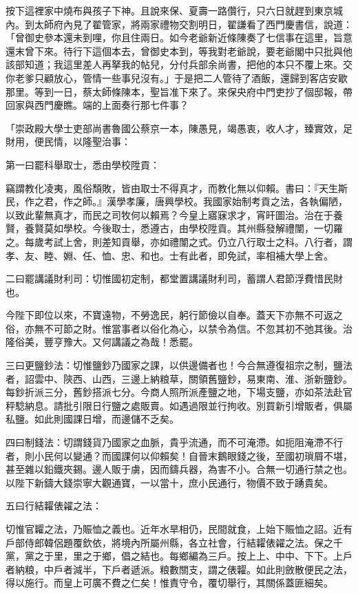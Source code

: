 按下這裡家中燒布與孩子下神。且說來保、夏壽一路儹行，只六日就趕到東京城內。到太師府內見了翟管家，將兩家禮物交割明日，翟謙看了西門慶書信，說道：「曾御史參本還未到哩，你且住兩日。如今老爺新近條陳奏了七信事在這里，旨意還末曾下來。待行下這個本去，曾御史本到，等我對老爺說，要老爺閣中只批與他該部知道；我這里差人再拏我的帖兒，分付兵部余尚書，把他的本只不覆上來。交你老爹只顧放心，管情一些事兒沒有。」于是把二人管待了酒飯，還歸到客店安歇那里。等到一日，蔡太師條陳本，聖旨准下來了。來保央府中門吏抄了個邸報，帶回家與西門慶瞧。端的上面奏行那七件事？

「崇政殿大學士吏部尚書魯國公蔡京一本，陳愚見，竭愚衷，收人才，臻實效，足財用，便民情，以隆聖治事：

第一曰罷科舉取士，悉由學校陞貢：

竊謂教化凌夷，風俗頹敗，皆由取士不得真才，而教化無以仰賴。書曰：『天生斯民，作之君，作之師。』漢學孝廉，唐興學校。我國家始制考貢之法，各執偏陋，以致此輩無真才，而民之司牧何以賴焉？今皇上寤寐求才，宵旰圖治。治在于養賢，養賢莫如學校。今後取士，悉遵古，由學校陞貢。其州縣發解禮闈，一切羅之。每歲考試上舍，則差知貢舉，亦如禮闈之式。仍立八行取士之科。八行者，謂孝、友、睦、婣、任、恤、忠、和也。士有此者，即免試，率相補大學上舍。

二曰罷講議財利司：切惟國初定制，都堂置講議財利司，蓄謂人君節浮費惜民財也。

今陛下即位以來，不寶遠物，不勞逸民，躬行節儉以自奉。蓋天下亦無不可返之俗，亦無不可節之財。惟當事者以俗化為心，以禁令為信。不忽其初不弛其後。治隆俗美，豐亨豫大。又何講議之為哉！悉罷。

三曰更鹽鈔法：切惟鹽鈔乃國家之課，以供邊備者也！今合無遵復祖宗之制，鹽法者，詔雲中、陝西、山西，三邊上納粮草，關領舊鹽鈔，易東南、淮、浙新鹽鈔。每鈔折派三分，舊鈔搭派七分。今商人照所派產鹽之地，下場支鹽，亦如茶法赴官秤騐納息。請批引限日行鹽之處販賣。如遇過限並行拘收。別買新引增販者，俱屬私鹽。如此則國課日增，而邊儲不乏矣。

四曰制錢法：切謂錢貨乃國家之血脈，貴乎流通，而不可淹滯。如扼阻淹滯不行者，則小民何以變通？而國課何以仰賴矣！自晉末鵝眼錢之後，至國初瑣屑不堪，甚至雜以鉛鐵夾錫。邊人販于虜，因而鑄兵器，為害不小。合無一切通行禁之也。以陛下新鑄大錢崇寧大觀通寶，一以當十，庶小民通行，物價不致于踴貴矣。

五曰行結糶俵糴之法：

切惟官糶之法，乃賑恤之義也。近年水旱相仍，民間就食，上始下賑恤之詔。近有戶部侍郎韓侶題覆欽依，將境內所屬州縣，各立社會，行結糶俵糴之法。保之千黨，黨之于里，里之于鄉，倡之結也。每鄉編為三戶。按上上、中中、下下。上戶者納粮，中戶者減半，下戶者遞派。粮數關支，謂之俵糶。如此則斂散便民之法，得以施行。而皇上可廣不費之仁矣！惟責守令，覆切舉行，其關係蓋匪細矣。

